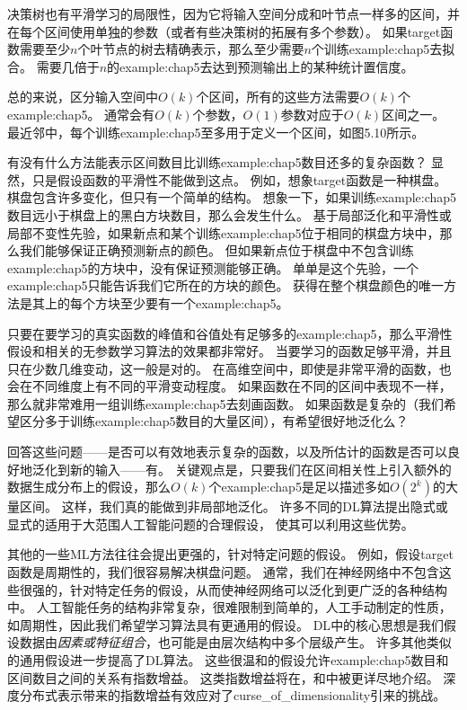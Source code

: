 决策树也有平滑学习的局限性，因为它将输入空间分成和叶节点一样多的区间，并在每个区间使用单独的参数（或者有些决策树的拓展有多个参数）。
如果\gls{target}函数需要至少$n$个叶节点的树去精确表示，那么至少需要$n$个训练\gls{example:chap5}去拟合。
需要几倍于$n$的\gls{example:chap5}去达到预测输出上的某种统计置信度。


总的来说，区分输入空间中$O(k)$个区间，所有的这些方法需要$O(k)$个\gls{example:chap5}。
通常会有$O(k)$个参数，$O(1)$参数对应于$O(k)$区间之一。
最近邻中，每个训练\gls{example:chap5}至多用于定义一个区间，如图5.10所示。

有没有什么方法能表示区间数目比训练\gls{example:chap5}数目还多的复杂函数？
显然，只是假设函数的平滑性不能做到这点。
例如，想象\gls{target}函数是一种棋盘。
棋盘包含许多变化，但只有一个简单的结构。
想象一下，如果训练\gls{example:chap5}数目远小于棋盘上的黑白方块数目，那么会发生什么。
基于局部泛化和平滑性或局部不变性先验，如果新点和某个训练\gls{example:chap5}位于相同的棋盘方块中，那么我们能够保证正确预测新点的颜色。
但如果新点位于棋盘中不包含训练\gls{example:chap5}的方块中，没有保证预测能够正确。
单单是这个先验，一个\gls{example:chap5}只能告诉我们它所在的方块的颜色。
获得在整个棋盘颜色的唯一方法是其上的每个方块至少要有一个\gls{example:chap5}。


只要在要学习的真实函数的峰值和谷值处有足够多的\gls{example:chap5}，那么平滑性假设和相关的无参数学习算法的效果都非常好。
当要学习的函数足够平滑，并且只在少数几维变动，这一般是对的。
在高维空间中，即使是非常平滑的函数，也会在不同维度上有不同的平滑变动程度。
如果函数在不同的区间中表现不一样，那么就非常难用一组训练\gls{example:chap5}去刻画函数。
如果函数是复杂的（我们希望区分多于训练\gls{example:chap5}数目的大量区间），有希望很好地泛化么？

回答这些问题——是否可以有效地表示复杂的函数，以及所估计的函数是否可以良好地泛化到新的输入——有。
关键观点是，只要我们在区间相关性上引入额外的数据生成分布上的假设，那么$O(k)$个\gls{example:chap5}是足以描述多如$O(2^k)$的大量区间。
这样，我们真的能做到非局部地泛化\citep{Bengio+Monperrus-2005,NIPS2005_539}。
许多不同的\gls{DL}算法提出隐式或显式的适用于大范围人工智能问题的合理假设， 使其可以利用这些优势。

其他的一些\gls{ML}方法往往会提出更强的，针对特定问题的假设。
例如，假设\gls{target}函数是周期性的，我们很容易解决棋盘问题。
通常，我们在神经网络中不包含这些很强的，针对特定任务的假设，从而使神经网络可以泛化到更广泛的各种结构中。
人工智能任务的结构非常复杂，很难限制到简单的，人工手动制定的性质，如周期性，因此我们希望学习算法具有更通用的假设。
\gls{DL}中的核心思想是我们假设数据由\emph{因素或特征组合}，也可能是由层次结构中多个层级产生。
许多其他类似的通用假设进一步提高了\gls{DL}算法。
这些很温和的假设允许\gls{example:chap5}数目和区间数目之间的关系有指数增益。
这类指数增益将在，和中被更详尽地介绍。
深度分布式表示带来的指数增益有效应对了\gls{curse_of_dimensionality}引来的挑战。

